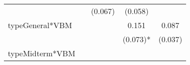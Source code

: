 \documentclass[12pt,twoside]{reedthesis}
\begin{document}
\begin{longtable}[]{@{}lcccc@{}}
\begin{minipage}[t]{0.14\columnwidth}
  \strut
  \end{minipage} & \begin{minipage}[t]{0.18\columnwidth}\centering\strut
  \strut
  \end{minipage} & \begin{minipage}[t]{0.20\columnwidth}\centering\strut
  (0.067)\strut
  \end{minipage} & \begin{minipage}[t]{0.11\columnwidth}\centering\strut
  (0.058)\strut
  \end{minipage}\tabularnewline
  \begin{minipage}[t]{0.23\columnwidth}\raggedright\strut
  typeGeneral*VBM\strut
  \end{minipage} & \begin{minipage}[t]{0.14\columnwidth}\centering\strut
  \strut
  \end{minipage} & \begin{minipage}[t]{0.18\columnwidth}\centering\strut
  \strut
  \end{minipage} & \begin{minipage}[t]{0.20\columnwidth}\centering\strut
  0.151\strut
  \end{minipage} & \begin{minipage}[t]{0.11\columnwidth}\centering\strut
  0.087\strut
  \end{minipage}\tabularnewline
  \begin{minipage}[t]{0.23\columnwidth}\raggedright\strut
  \strut
  \end{minipage} & \begin{minipage}[t]{0.14\columnwidth}\centering\strut
  \strut
  \end{minipage} & \begin{minipage}[t]{0.18\columnwidth}\centering\strut
  \strut
  \end{minipage} & \begin{minipage}[t]{0.20\columnwidth}\centering\strut
  (0.073)*\strut
  \end{minipage} & \begin{minipage}[t]{0.11\columnwidth}\centering\strut
  (0.037)\strut
  \end{minipage}\tabularnewline
  \begin{minipage}[t]{0.23\columnwidth}\raggedright\strut
  typeMidterm*VBM\strut
  \end{minipage} & \begin{minipage}[t]{0.14\columnwidth}\centering\strut
  \strut
  \end{minipage} & \begin{minipage}[t]{0.18\columnwidth}\centering\strut

\end{minipage}
\end{longtable}
\end{document}
